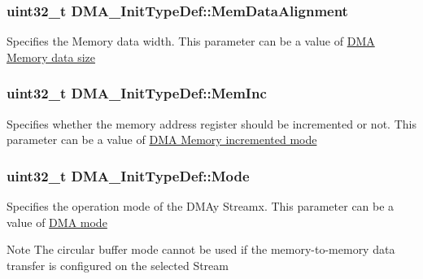 \subsubsection[{\texorpdfstring{Mem\+Data\+Alignment}{MemDataAlignment}}]{\setlength{\rightskip}{0pt plus 5cm}uint32\+\_\+t D\+M\+A\+\_\+\+Init\+Type\+Def\+::\+Mem\+Data\+Alignment}\hypertarget{struct_d_m_a___init_type_def_a7784efedc4a61325fa7364fcace10136}{}\label{struct_d_m_a___init_type_def_a7784efedc4a61325fa7364fcace10136}
Specifies the Memory data width. This parameter can be a value of \hyperlink{group___d_m_a___memory__data__size}{D\+MA Memory data size} 
\subsubsection[{\texorpdfstring{Mem\+Inc}{MemInc}}]{\setlength{\rightskip}{0pt plus 5cm}uint32\+\_\+t D\+M\+A\+\_\+\+Init\+Type\+Def\+::\+Mem\+Inc}\hypertarget{struct_d_m_a___init_type_def_a49b187ba5ab8ba4354e02837e8b99414}{}\label{struct_d_m_a___init_type_def_a49b187ba5ab8ba4354e02837e8b99414}
Specifies whether the memory address register should be incremented or not. This parameter can be a value of \hyperlink{group___d_m_a___memory__incremented__mode}{D\+MA Memory incremented mode} 
\subsubsection[{\texorpdfstring{Mode}{Mode}}]{\setlength{\rightskip}{0pt plus 5cm}uint32\+\_\+t D\+M\+A\+\_\+\+Init\+Type\+Def\+::\+Mode}\hypertarget{struct_d_m_a___init_type_def_adbbca090b53d32ac93cc7359b7994db2}{}\label{struct_d_m_a___init_type_def_adbbca090b53d32ac93cc7359b7994db2}
Specifies the operation mode of the D\+M\+Ay Streamx. This parameter can be a value of \hyperlink{group___d_m_a__mode}{D\+MA mode} \begin{DoxyNote}{Note}
The circular buffer mode cannot be used if the memory-\/to-\/memory data transfer is configured on the selected Stream 
\end{DoxyNote}
